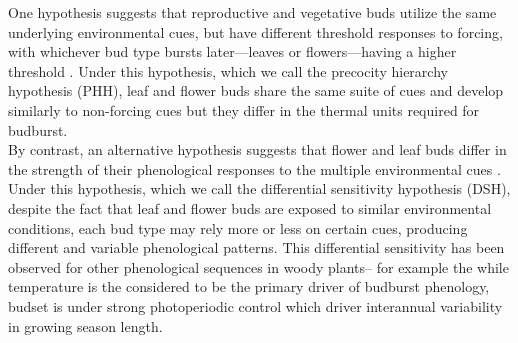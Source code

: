 \documentclass[11pt]{article}
\begin{document}
\noindent One hypothesis suggests that reproductive and vegetative buds utilize the same underlying environmental cues, but have different threshold responses to forcing, with whichever bud type bursts later---leaves or flowers---having a higher threshold \citep{Guo2014,COSMULESCU:2020aa,Cosmulescu:2018aa}. Under this hypothesis, which we call the precocity hierarchy hypothesis (PHH), leaf and flower buds share the same suite of cues and develop similarly to non-forcing cues but they differ in the thermal units required for budburst.\\

\noindent By contrast, an alternative hypothesis suggests that flower and leaf buds differ in the strength of their phenological responses to the multiple environmental cues \citep{Citadin2001,Gariglio2006,Aslani2009,Mehlenbacher:1991aa}. Under this hypothesis, which we call the differential sensitivity hypothesis (DSH), despite the fact that leaf and flower buds are exposed to similar environmental conditions, each bud type may rely more or less on certain cues, producing different and variable phenological patterns. This differential sensitivity has been observed for other phenological sequences in woody plants-- for example the while temperature is the considered to be the primary driver of budburst phenology, budset is under strong photoperiodic control \citep{} which driver interannual variability in growing season length.\\
\end{document}
